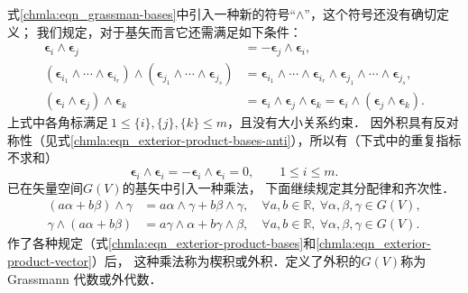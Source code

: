 式\eqref{chmla:eqn_grassman-bases}中引入一种新的符号“$\wedge$”，这个符号还没有确切定义；
我们规定，对于基矢而言它还需满足如下条件：
\begin{subequations}\label{chmla:eqn_exterior-product-bases}
\begin{align}
    \boldsymbol{\epsilon}_{i} \wedge \boldsymbol{\epsilon}_{j} &=
    -\boldsymbol{\epsilon}_{j} \wedge \boldsymbol{\epsilon}_{i},
       \label{chmla:eqn_exterior-product-bases-anti} \\
    (\boldsymbol{\epsilon}_{i_1} \wedge \cdots \wedge\boldsymbol{\epsilon}_{i_r} ) \wedge
    (\boldsymbol{\epsilon}_{j_1} \wedge \cdots \wedge\boldsymbol{\epsilon}_{j_s} ) & =
    \boldsymbol{\epsilon}_{i_1} \wedge \cdots\wedge \boldsymbol{\epsilon}_{i_r}  \wedge
    \boldsymbol{\epsilon}_{j_1} \wedge \cdots \wedge\boldsymbol{\epsilon}_{j_s},
       \label{chmla:eqn_exterior-product-tensorofbases} \\
    (\boldsymbol{\epsilon}_{i} \wedge \boldsymbol{\epsilon}_{j}) \wedge \boldsymbol{\epsilon}_{k} &=
    \boldsymbol{\epsilon}_{i} \wedge \boldsymbol{\epsilon}_{j} \wedge \boldsymbol{\epsilon}_{k}=
    \boldsymbol{\epsilon}_{i} \wedge (\boldsymbol{\epsilon}_{j} \wedge \boldsymbol{\epsilon}_{k})  .
       \label{chmla:eqn_exterior-product-bases-association}
\end{align}
\end{subequations}
上式中各角标满足$\  1 \leqslant \{i\}, \{j\}, \{k\} \leqslant m $，且没有大小关系约束．
因外积具有反对称性（见式\eqref{chmla:eqn_exterior-product-bases-anti}），所以有（下式中的重复指标不求和）
\begin{equation}
    \boldsymbol{\epsilon}_{i} \wedge \boldsymbol{\epsilon}_{i} =
    -\boldsymbol{\epsilon}_{i} \wedge \boldsymbol{\epsilon}_{i} =0 ,
    \qquad 1 \leqslant i \leqslant m .
\end{equation}
已在矢量空间$G(V)$的基矢中引入一种{\kaishu 乘法}，
下面继续规定其分配律和齐次性．
\begin{subequations}\label{chmla:eqn_exterior-product-vector}
    \begin{align}
        (a \alpha + b\beta) \wedge \gamma &= a \alpha \wedge \gamma
        + b\beta \wedge \gamma ,  \quad \forall a,b \in \mathbb{R},
        \ \forall \alpha,\beta , \gamma\in G(V),\\
        \gamma \wedge(a \alpha + b\beta) &= a \gamma \wedge \alpha
        + b\gamma \wedge \beta ,  \quad \forall a,b \in \mathbb{R},
        \ \forall \alpha,\beta, \gamma \in G(V).
    \end{align}
\end{subequations}
作了各种规定（式\eqref{chmla:eqn_exterior-product-bases}和\eqref{chmla:eqn_exterior-product-vector}）后，
这种乘法称为{\heiti 楔积}或{\heiti 外积}．定义了外积的$G(V)$称为{Grassmann 代数}或{\heiti 外代数}．

